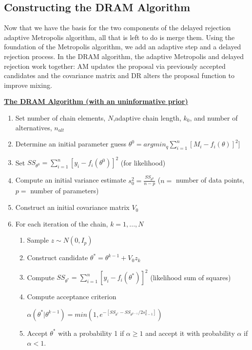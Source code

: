 \documentclass{article}
\begin{document}
\subsection{Constructing the DRAM Algorithm}
Now that we have the basis for the two components of the delayed rejection adaptive Metropolis algorithm, all that is left to do is merge them. Using the foundation of the Metropolis algorithm, we add an adaptive step and a delayed rejection process. In the DRAM algorithm, the adaptive Metropolis and delayed rejection work together: AM updates the proposal via previously accepted candidates and the covariance matrix and DR alters the proposal function to improve mixing.
\begin{tcolorbox}
\textbf{\underline{The DRAM Algorithm (with an uninformative prior)}} 
\begin{enumerate}
\item Set number of chain elements, $N$,adaptive chain length, $k_0$, and number of alternatives, $n_{alt}$
    \item Determine an initial parameter guess $\theta^0 = argmin_q \sum_{i=1}^{n}[M_i - f_i(\theta)]^2]$
    \item Set $SS_{\theta^0} = \sum_{i = 1}^{n}[y_i - f_i(\theta^0)]^2$ (for likelihood)
    \item Compute an initial variance estimate $s_0^2 = \frac{SS_{\theta^0}}{n-p}$ ($n =$ number of data points, $p = $ number of parameters)
    \item Construct an initial covariance matrix $V_0$ 
    \item For each iteration of the chain, $k = 1,...,N$
    \begin{enumerate}
        \item Sample $z \sim N(0,I_p)$
        \item Construct candidate $\theta^* = \theta^{k-1}+ V_0z_k$
        \item Compute $SS_{\theta^*} = \sum_{i = 1}^{n}[y_i - f_i(\theta^*)]^2$ (likelihood sum of squares)
        \item Compute acceptance criterion
            \begin{center}
                $\alpha(\theta^* | \theta^{k-1}) = min(1, e^{-[SS_{\theta^*}-SS_{\theta^{k-1}}/2s_{k-1}^2]})$
            \end{center}
        \item Accept $\theta^*$ with a probability 1 if $\alpha \geq 1$ and accept it with probability $\alpha$ if $\alpha < 1$.
        \begin{tcolorbox}[colback=red!5,colframe=red!75!black,title=DRAM Step]

\end{tcolorbox}
\end{enumerate}
\end{enumerate}
\end{tcolorbox}
\end{document}
